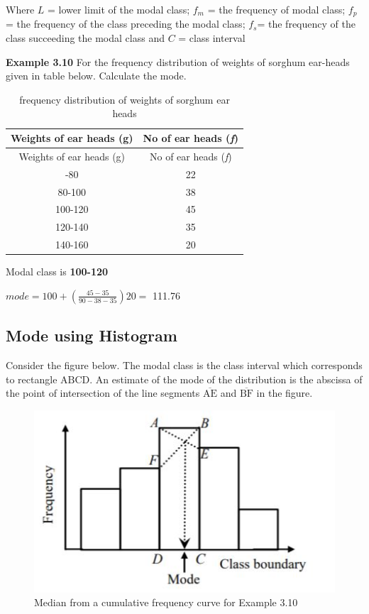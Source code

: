 \documentclass[
]{book}
\begin{document}
Where \(L\) = lower limit of the modal class; \(f_{m}\) = the frequency of modal class; \(f_{p}\)= the frequency of
the class preceding the modal class; \(f_{s}\)= the frequency of the class
succeeding the modal class and \(C\) = class interval

\textbf{Example 3.10} For the frequency distribution of weights of sorghum
ear-heads given in table below. Calculate the mode.

\begin{longtable}[]{@{}cc@{}}
\caption{\label{tab:earhead}frequency distribution of weights of sorghum ear heads}\tabularnewline
\toprule\noalign{}
Weights of ear heads (g) & No of ear heads (\emph{f}) \\
\midrule\noalign{}
\endfirsthead
\toprule\noalign{}
Weights of ear heads (g) & No of ear heads (\emph{f}) \\
\midrule\noalign{}
\endhead
\bottomrule\noalign{}
\endlastfoot
60-80 & 22 \\
80-100 & 38 \\
100-120 & 45 \\
120-140 & 35 \\
140-160 & 20 \\
\end{longtable}

Modal class is \textbf{100-120}

\(mode = 100 + \left( \frac{45-35}{90-38-35} \right)20 =\) 111.76

\subsection{\texorpdfstring{\textbf{Mode using Histogram}}{Mode using Histogram}}\label{mode-using-histogram}

Consider the figure below. The modal class is the class interval which
corresponds to rectangle \(\text{ABCD}\). An estimate of the mode of the
distribution is the abscissa of the point of intersection of the line
segments \(\overline{\text{AE}}\) and \(\overline{\text{BF}}\) in the
figure.

\begin{figure}

{\centering \includegraphics[width=0.6\linewidth]{images/l2m1} 

}

\caption{Median from a cumulative frequency curve for Example 3.10}\label{fig:cf1}
\end{figure}
\end{document}
